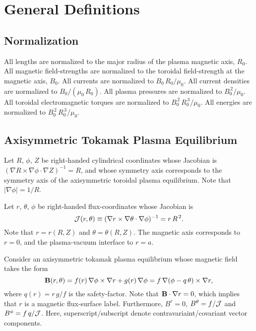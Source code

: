\documentclass[12pt,prb,aps]{revtex4-1}
\begin{document}
\appendix

\section{General Definitions}
\subsection{Normalization}\label{coords}
All lengths are normalized to  the major radius of the plasma magnetic axis, $R_0$. All magnetic field-strengths
are normalized to the  toroidal field-strength at the magnetic axis, $B_0$. All currents are normalized to $B_0\,R_0/\mu_0$. All current densities are normalized to $B_0/(\mu_0\,R_0)$.  All plasma pressures are normalized to $B_0^{\,2}/\mu_0$.
All toroidal electromagnetic torques are normalized to $B_0^{\,2}\,R_0^{\,3}/\mu_0$. All energies are normalized to $B_0^{\,2}\,R_0^{\,3}/\mu_0$. 

\subsection{Axisymmetric Tokamak Plasma Equilibrium}\label{s3}
Let $R$, $\phi$, $Z$ be right-handed cylindrical coordinates whose Jacobian 
is $ (\nabla R\times \nabla\phi\cdot\nabla Z)^{-1} = R$, 
and whose symmetry axis corresponds to the symmetry axis of the axisymmetric toroidal plasma equilibrium. 
Note that $|\nabla\phi|=1/R$. 

Let $r$, $\theta$, $\phi$ be right-handed flux-coordinates whose
Jacobian is
\begin{equation}\label{jac}
{\cal J}(r,\theta)\equiv (\nabla r\times \nabla\theta\cdot\nabla\phi)^{-1}= r\,R^{\,2}.
\end{equation}
Note that $r=r(R,Z)$ and $\theta=\theta(R,Z)$. 
The magnetic axis corresponds to $r=0$, and the plasma-vacuum interface to $r=a$. 

Consider an axisymmetric tokamak plasma equilibrium whose magnetic field takes the form
\begin{equation}
{\bf B}(r,\theta) = f(r)\,\nabla\phi\times \nabla r + g(r)\,\nabla\phi = f\,\nabla(\phi-q\,\theta)\times \nabla r,
\end{equation}
where
$q(r) = r\,g/f$ is the safety-factor. Note that ${\bf B}\cdot\nabla r=0$, which implies that $r$ is a magnetic flux-surface label.
Furthermore,   $B^r=0$, $B^\theta= f/{\cal J}$ and  $B^\phi =f\,q/{\cal J}$. Here, superscript/subscript denote contravariaint/covariant
vector components. 
\end{document}
